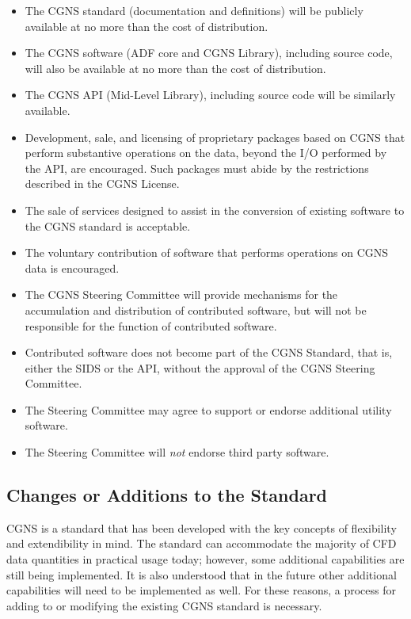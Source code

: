 \begin{itemize}
\item The CGNS standard (documentation and definitions) will be publicly
      available at no more than the cost of distribution.
\item The CGNS software (ADF core and CGNS Library), including source
      code, will also be available at no more than the cost of
      distribution.
\item The CGNS API (Mid-Level Library), including source code will be
      similarly available.
\item Development, sale, and licensing of proprietary packages based on
      CGNS that perform substantive operations on the data, beyond the
      I/O performed by the API, are encouraged.
      Such packages must abide by the restrictions described in the
      CGNS License.
\item The sale of services designed to assist in the conversion of
      existing software to the CGNS standard is acceptable.
\item The voluntary contribution of software that performs operations on
      CGNS data is encouraged.
\item The CGNS Steering Committee will provide mechanisms for the
      accumulation and distribution of contributed software, but will not
      be responsible for the function of contributed software.
\item Contributed software does not become part of the CGNS Standard,
      that is, either the SIDS or the API, without the approval of the
      CGNS Steering Committee.
\item The Steering Committee may agree to support or endorse additional
      utility software.
\item The Steering Committee will \emph{not} endorse third party
      software.
\end{itemize}

\subsection{Changes or Additions to the Standard}
\label{s:changes}

CGNS is a standard that has been developed with the key concepts of
flexibility and extendibility in mind.
The standard can accommodate the majority of CFD data quantities in
practical usage today; however, some additional capabilities are still
being implemented.
It is also understood that in the future other additional capabilities
will need to be implemented as well.
For these reasons, a process for adding to or modifying the existing
CGNS standard is necessary.

